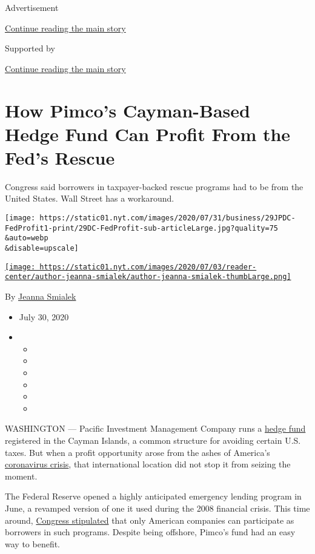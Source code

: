Advertisement

\protect\hyperlink{after-top}{Continue reading the main story}

Supported by

\protect\hyperlink{after-sponsor}{Continue reading the main story}

\hypertarget{how-pimcos-cayman-based-hedge-fund-can-profit-from-the-feds-rescue}{%
\section{How Pimco's Cayman-Based Hedge Fund Can Profit From the Fed's
Rescue}\label{how-pimcos-cayman-based-hedge-fund-can-profit-from-the-feds-rescue}}

Congress said borrowers in taxpayer-backed rescue programs had to be
from the United States. Wall Street has a workaround.

\texttt{[image: https://static01.nyt.com/images/2020/07/31/business/29JPDC-FedProfit1-print/29DC-FedProfit-sub-articleLarge.jpg?quality=75\\\&auto=webp\\\&disable=upscale]}

\href{https://www.nytimes.com/by/jeanna-smialek}{\texttt{[image: https://static01.nyt.com/images/2020/07/03/reader-center/author-jeanna-smialek/author-jeanna-smialek-thumbLarge.png]}}

By \href{https://www.nytimes.com/by/jeanna-smialek}{Jeanna Smialek}

\begin{itemize}
\item
  July 30, 2020
\item
  \begin{itemize}
  \item
  \item
  \item
  \item
  \item
  \item
  \end{itemize}
\end{itemize}

WASHINGTON --- Pacific Investment Management Company runs a
\href{https://sec.report/Document/0001569540-16-000003/}{hedge fund}
registered in the Cayman Islands, a common structure for avoiding
certain U.S. taxes. But when a profit opportunity arose from the ashes
of America's
\href{https://www.nytimes.com/news-event/coronavirus}{coronavirus
crisis}, that international location did not stop it from seizing the
moment.

The Federal Reserve opened a highly anticipated emergency lending
program in June, a revamped version of one it used during the 2008
financial crisis. This time around,
\href{https://assets.documentcloud.org/documents/20059055/final-final-cares-act.pdf}{Congress
stipulated} that only American companies can participate as borrowers in
such programs. Despite being offshore, Pimco's fund had an easy way to
benefit.

